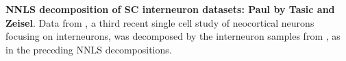 \textbf{NNLS decomposition of SC interneuron datasets: Paul by Tasic and Zeisel}.
Data from \citep{Paul_2017}, a third recent single cell study of neocortical neurons focusing on interneurons, was decomposed by the interneuron samples from \citep{Tasic_2018,Zeisel_2018}, as in the preceding NNLS decompositions. 